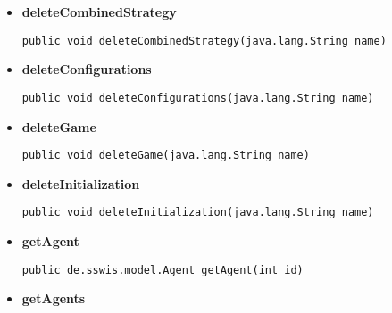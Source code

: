 {{{{{{\begin{itemize}
{\begin{lstlisting}[frame=none]
public void deleteAgents(int id)\end{lstlisting} %
}%
\item{ 
\hypertarget{de.sswis.controller.ModelProvider.deleteCombinedStrategy(java.lang.String)}{{\bf  deleteCombinedStrategy}\\}
\begin{lstlisting}[frame=none]
public void deleteCombinedStrategy(java.lang.String name)\end{lstlisting} %
}%
\item{ 
\hypertarget{de.sswis.controller.ModelProvider.deleteConfigurations(java.lang.String)}{{\bf  deleteConfigurations}\\}
\begin{lstlisting}[frame=none]
public void deleteConfigurations(java.lang.String name)\end{lstlisting} %
}%
\item{ 
\hypertarget{de.sswis.controller.ModelProvider.deleteGame(java.lang.String)}{{\bf  deleteGame}\\}
\begin{lstlisting}[frame=none]
public void deleteGame(java.lang.String name)\end{lstlisting} %
}%
\item{ 
\hypertarget{de.sswis.controller.ModelProvider.deleteInitialization(java.lang.String)}{{\bf  deleteInitialization}\\}
\begin{lstlisting}[frame=none]
public void deleteInitialization(java.lang.String name)\end{lstlisting} %
}%
\item{ 
\hypertarget{de.sswis.controller.ModelProvider.getAgent(int)}{{\bf  getAgent}\\}
\begin{lstlisting}[frame=none]
public de.sswis.model.Agent getAgent(int id)\end{lstlisting} %
}%
\item{ 
\hypertarget{de.sswis.controller.ModelProvider.getAgents()}{{\bf  getAgents}\\}
\begin{lstlisting}[frame=none]

\end{lstlisting}}
\end{itemize}}}}}}}

